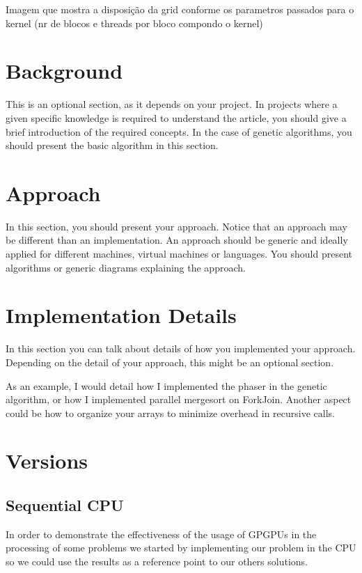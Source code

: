\documentclass[runningheads]{llncs}
\begin{document}
\newline

Imagem que mostra a disposição da grid conforme os parametros passados para o kernel (nr de blocos e threads por bloco compondo o kernel)


\section{Background}

This is an optional section, as it depends on your project. In projects where a given specific knowledge is required to understand the article, you should give a brief introduction of the required concepts. In the case of genetic algorithms, you should present the basic algorithm in this section.


\section{Approach}

In this section, you should present your approach. Notice that an approach may be different than an implementation. An approach should be generic and ideally applied for different machines, virtual machines or languages. You should present algorithms or generic diagrams explaining the approach.

\section{Implementation Details}

In this section you can talk about details of how you implemented your approach. Depending on the detail of your approach, this might be an optional section.

As an example, I would detail how I implemented the phaser in the genetic algorithm, or how I implemented parallel mergesort on ForkJoin. Another aspect could be how to organize your arrays to minimize overhead in recursive calls.

\section{Versions}
\subsection{Sequential CPU}
In order to demonstrate the effectiveness of the usage of GPGPUs in the processing 
of some problems we started by implementing our problem in the CPU so we could use the results as a reference point to our others solutions.
\end{document}
